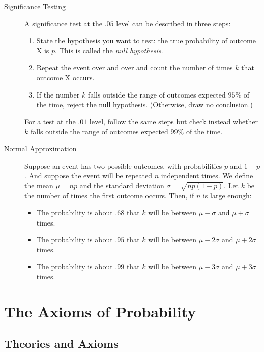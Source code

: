 \documentclass[justified]{tufte-book}
\providecommand{\tightlist}{%
  \setlength{\itemsep}{0pt}\setlength{\parskip}{0pt}}
\theoremstyle{definition}
\theoremstyle{definition}
\theoremstyle{definition}
\theoremstyle{remark}
\begin{document}
\begin{description}
\item[Significance Testing]
A significance test at the \(.05\) level can be described in three
steps:

\begin{enumerate}
\def\labelenumi{\arabic{enumi}.}
\tightlist
\item
  State the hypothesis you want to test: the true probability of outcome
  X is \(p\). This is called the \emph{null hypothesis}.
\item
  Repeat the event over and over and count the number of times \(k\)
  that outcome X occurs.
\item
  If the number \(k\) falls outside the range of outcomes expected
  \(95\%\) of the time, reject the null hypothesis. (Otherwise, draw no
  conclusion.)
\end{enumerate}

For a test at the \(.01\) level, follow the same steps but check instead
whether \(k\) falls outside the range of outcomes expected \(99\%\) of
the time.
\item[Normal Approximation]
Suppose an event has two possible outcomes, with probabilities \(p\) and
\(1-p\). And suppose the event will be repeated \(n\) independent times.
We define the mean \(\mu = np\) and the standard deviation
\(\sigma = \sqrt{np(1-p)}\). Let \(k\) be the number of times the first
outcome occurs. Then, if \(n\) is large enough:

\begin{itemize}
\tightlist
\item
  The probability is about \(.68\) that \(k\) will be between
  \(\mu - \sigma\) and \(\mu + \sigma\) times.
\item
  The probability is about \(.95\) that \(k\) will be between
  \(\mu - 2\sigma\) and \(\mu + 2\sigma\) times.
\item
  The probability is about \(.99\) that \(k\) will be between
  \(\mu - 3\sigma\) and \(\mu + 3\sigma\) times.
\end{itemize}
\end{description}

\hypertarget{the-axioms-of-probability}{%
\chapter{The Axioms of Probability}\label{the-axioms-of-probability}}

\hypertarget{theories-and-axioms}{%
\section*{Theories and Axioms}\label{theories-and-axioms}}
\end{document}
